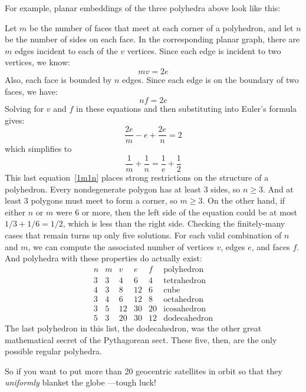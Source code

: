 For example, planar embeddings of the three polyhedra above look like
this:

\begin{center}

\end{center}

Let $m$ be the number of faces that meet at each corner of a
polyhedron, and let $n$ be the number of sides on each face.  In the
corresponding planar graph, there are $m$ edges incident to each of
the $v$ vertices.  Since each edge is incident to two vertices, we
know:
%
\[
m v = 2 e
\]
%
Also, each face is bounded by $n$ edges.  Since each edge is on the
boundary of two faces, we have:
%
\[
n f = 2 e
\]
%
Solving for $v$ and $f$ in these equations and then substituting into
Euler's formula gives:
\[
\frac{2e}{m} - e + \frac{2e}{n} = 2
\]
which simplifies to
\begin{equation}\label{1m1n}
\frac{1}{m} + \frac{1}{n} = \frac{1}{e} + \frac{1}{2}
\end{equation}
%
This last equation~\eqref{1m1n} places strong restrictions on the
structure of a polyhedron.  Every nondegenerate polygon has at least 3
sides, so $n \geq 3$.  And at least 3 polygons must meet to form a corner,
so $m \geq 3$.  On the other hand, if either $n$ or $m$ were 6 or more,
then the left side of the equation could be at most $1/3 + 1/6 = 1/2$,
which is less than the right side.  Checking the finitely-many cases that
remain turns up only five solutions.  For each valid combination of $n$
and $m$, we can compute the associated number of vertices $v$, edges $e$,
and faces $f$.  And polyhedra with these properties do actually exist:
%
\[
\begin{array}{cc|ccc|l}
n & m & v  & e  &  f & \text{polyhedron} \\ \hline
3 & 3 & 4  & 6  &  4 & \text{tetrahedron} \\
4 & 3 & 8  & 12 &  6 & \text{cube} \\
3 & 4 & 6  & 12 &  8 & \text{octahedron} \\
3 & 5 & 12 & 30 & 20 & \text{icosahedron} \\
5 & 3 & 20 & 30 & 12 & \text{dodecahedron}
\end{array}
\]
%
The last polyhedron in this list, the dodecahedron, was the other great
mathematical secret of the Pythagorean sect.  These five, then, are the
only possible regular polyhedra.

So if you want to put more than 20 geocentric satellites in orbit so that
they \emph{uniformly} blanket the globe ---tough luck!





\endinput